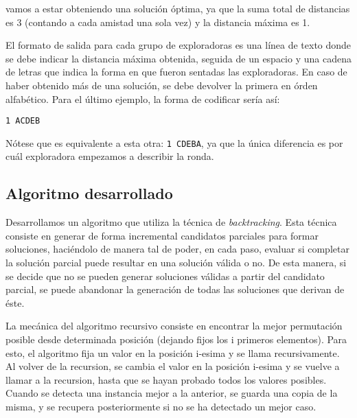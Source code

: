 vamos a estar obteniendo una solución óptima, ya que la suma total de distancias es 3 (contando a cada amistad una sola vez) y la distancia máxima es 1.

El formato de salida para cada grupo de exploradoras es una línea de texto donde se debe indicar la distancia máxima obtenida, seguida de un espacio y una cadena de letras que indica la forma en que fueron sentadas las exploradoras. En caso de haber obtenido más de una solución, se debe devolver la primera en órden alfabético. Para el último ejemplo, la forma de codificar sería así:

\texttt{1 ACDEB}

Nótese que es equivalente a esta otra: \texttt{1 CDEBA}, ya que la única diferencia es por cuál exploradora empezamos a describir la ronda.



\subsection{Algoritmo desarrollado}

Desarrollamos un algoritmo que utiliza la técnica de \textit{backtracking}. Esta técnica consiste en generar de forma incremental candidatos parciales para formar soluciones, haciéndolo de manera tal de poder, en cada paso, evaluar si completar la solución parcial puede resultar en una solución válida o no. De esta manera, si se decide que no se pueden generar soluciones válidas a partir del candidato parcial, se puede abandonar la generación de todas las soluciones que derivan de éste.



La mecánica del algoritmo recursivo consiste en encontrar la mejor permutación posible desde determinada posición (dejando fijos los i primeros elementos).
Para esto, el algoritmo fija un valor en la posición i-esima y se llama recursivamente. Al volver de la recursion, se cambia el valor en la posición i-esima y se vuelve a llamar a la recursion, hasta que se hayan probado todos los valores posibles.
Cuando se detecta una instancia mejor a la anterior, se guarda una copia de la misma, y se recupera posteriormente si no se ha detectado un mejor caso.

